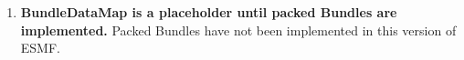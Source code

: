 

\begin{enumerate}

\item {\bf BundleDataMap is a placeholder until packed Bundles are
implemented.}  Packed Bundles have not been implemented in 
this version of ESMF. 

\end{enumerate}





